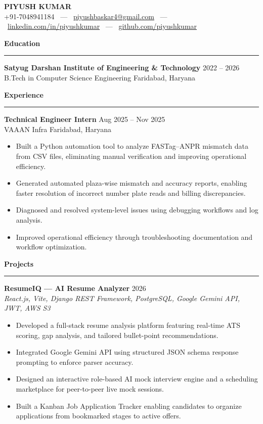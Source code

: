 \documentclass[10pt,letterpaper]{article}
\newcommand{\resumesection}[1]{
    \vspace{6pt}
    {\large\bfseries #1}
    \vspace{2pt}
    \hrule
    \vspace{3pt}
}
\begin{document}
\begin{center}
    {\Huge\bfseries PIYUSH KUMAR} \\
    \vspace{3pt}
    \small +91-7048941184 \ --- \ \href{mailto:piyushbaskar4@gmail.com}{piyushbaskar4@gmail.com} \ --- \ \href{https://linkedin.com/in/piyushkumar}{linkedin.com/in/piyushkumar} \ --- \ \href{https://github.com/piyushkumar}{github.com/piyushkumar}
\end{center}

\resumesection{Education}
\textbf{Satyug Darshan Institute of Engineering \& Technology} \hfill 2022 -- 2026 \\
B.Tech in Computer Science Engineering \hfill Faridabad, Haryana

\resumesection{Experience}
\textbf{Technical Engineer Intern} \hfill Aug 2025 -- Nov 2025 \\
VAAAN Infra \hfill Faridabad, Haryana
\begin{itemize}
    \item Built a Python automation tool to analyze FASTag--ANPR mismatch data from CSV files, eliminating manual verification and improving operational efficiency.
    \item Generated automated plaza-wise mismatch and accuracy reports, enabling faster resolution of incorrect number plate reads and billing discrepancies.
    \item Diagnosed and resolved system-level issues using debugging workflows and log analysis.
    \item Improved operational efficiency through troubleshooting documentation and workflow optimization.
\end{itemize}

\resumesection{Projects}

\textbf{ResumeIQ --- AI Resume Analyzer} \hfill 2026 \\
\textit{React.js, Vite, Django REST Framework, PostgreSQL, Google Gemini API, JWT, AWS S3}
\begin{itemize}
    \item Developed a full-stack resume analysis platform featuring real-time ATS scoring, gap analysis, and tailored bullet-point recommendations.
    \item Integrated Google Gemini API using structured JSON schema response prompting to enforce parser accuracy.
    \item Designed an interactive role-based AI mock interview engine and a scheduling marketplace for peer-to-peer live mock sessions.
    \item Built a Kanban Job Application Tracker enabling candidates to organize applications from bookmarked stages to active offers.
\end{itemize}
\end{document}
